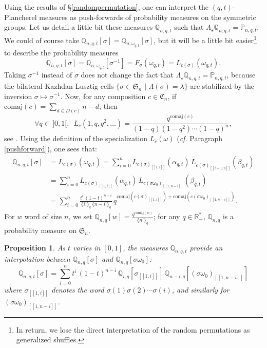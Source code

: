 \documentclass[smallextended,nospthms]{svjour3}
\newtheorem{proposition}[theorem]{Proposition}
\theoremstyle{remark}
\newcommand{\R}{\mathbb{R}}
\newcommand{\sym}{\mathfrak{S}}
\newcommand{\comp}{\mathfrak{C}}
\newcommand{\proba}{\mathbb{P}}
\newcommand{\qproba}{\mathbb{Q}}
\newcommand{\lle}{\left[\!\left[}
\newcommand{\rre}{\right]\!\right]}
\begin{document}
Using the results of \S\ref{randompermutation}, one can interpret the $(q,t)$-Plancherel measures as push-forwards of probability measures on the symmetric groups. Let us detail a little bit these measures $\qproba_{n,q,t}$ such that $\Lambda_{\star}\qproba_{n,q,t}=\proba_{n,q,t}$. We could of course take $\qproba_{n,q,t}[\sigma]=\qproba_{n,\omega_{q,t}}[\sigma]$, but it will be a little bit easier\footnote{In return, we lose the direct interpretation of the random permutations as generalized shuffles.} to describe the probability measures
$$\qproba_{n,q,t}[\sigma]=\qproba_{n,\omega_{q,t}}[\sigma^{-1}]=F_{\sigma}(\omega_{q,t})=L_{c(\sigma)}(\omega_{q,t}).$$
Taking $\sigma^{-1}$ instead of $\sigma$ does not change the fact that $\Lambda_{\star}\qproba_{n,q,t}=\proba_{n,q,t}$, because the bilateral Kazhdan-Lusztig cells $\{\sigma\in \sym_{n}\,\,|\,\,\Lambda(\sigma)=\lambda\}$ are stabilized by the inversion $\sigma \mapsto \sigma^{-1}$. Now, for any composition $c \in \comp_{n}$, if $\mathrm{comaj}(c)=\sum_{d \in D(c)} n-d$, then
$$\forall q \in\, ]0,1[,\,\,\,L_{c}(1,q,q^{2},\ldots)=\frac{q^{\mathrm{comaj}(c)}}{(1-q)(1-q^{2})\cdots(1-q)^{n}},$$
see \cite[\S7.19]{Stan91}. Using the definition of the specialization $L_{c}(\omega)$ (\emph{cf.} Paragraph \ref{pushforward}), one sees that:
\begin{align*}\qproba_{n,q,t}[\sigma]&=L_{c(\sigma)}(\omega_{q,t})=\sum_{i=0}^{n} L_{c(\sigma)_{\lle1,i\rre}}(\alpha_{q,t}) \,L_{\overline{c(\sigma)_{\lle i+1,n \rre}}}(\beta_{q,t})\\
&=\sum_{i=0}^{n} L_{c(\sigma)_{\lle1,i\rre}}(\alpha_{q,t}) \,L_{c(\sigma\omega_{0})_{\lle 1,n-i \rre}}(\beta_{q,t})\\
&=\sum_{i=0}^{n} \frac{t^{i}\,(1-t)^{n-i}}{\{i!\}_{q}\,\{n-i!\}_{q}}\,q^{\mathrm{comaj}(c(\sigma)_{\lle 1,i\rre})+\mathrm{comaj}(c(\sigma\omega_{0})_{\lle 1,n-i\rre})}.\end{align*}
For $w$ word of size $n$, we set $\qproba_{n,q}[w]=\frac{q^{\mathrm{comaj}(w)}}{\{n!\}_{q}}$; for any $q \in \R_{+}^{*}$, $\qproba_{n,q}$ is a probability measure on $\sym_{n}$. 
\begin{proposition}\label{interpolation}
As $t$ varies in $[0,1]$, the measures $\qproba_{n,q,t}$ provide an interpolation between $\qproba_{n,q}[\sigma]$ and $\qproba_{n,q}[\sigma\omega_{0}]$:
$$\qproba_{n,q,t}[\sigma]=\sum_{i=0}^{n} t^{i}\,(1-t)^{n-i}\,\qproba_{i,q}[\sigma_{\lle 1,i\rre}]\,\qproba_{n-i,q}[(\sigma\omega_{0})_{\lle 1,n-i\rre}]$$
where $\sigma_{\lle 1,i\rre}$ denotes the word $\sigma(1)\sigma(2)\cdots \sigma(i)$, and similarly for $(\sigma\omega_{0})_{\lle 1,n-i\rre}$.
\end{proposition}\bigskip
\end{document}
